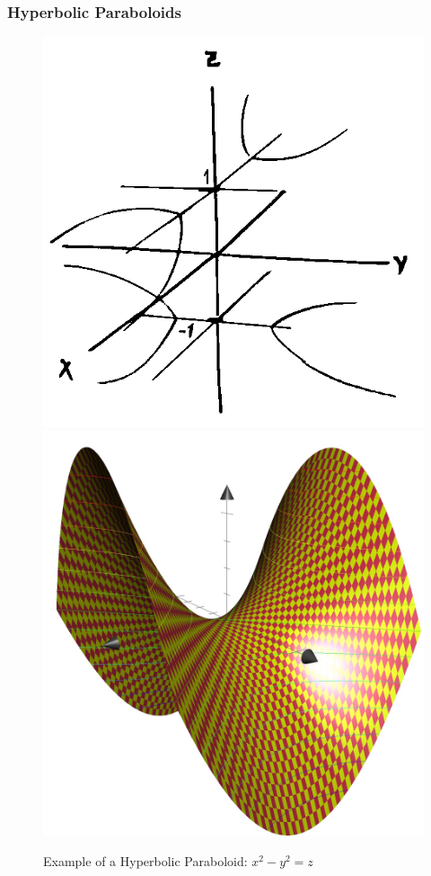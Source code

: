 \documentclass{article}
\begin{document}
\subsubsection{Hyperbolic Paraboloids}
\begin{figure}[h]
  \includegraphics[scale=0.5]{hyperbolic-paraboloid}
  \includegraphics[scale=0.1]{hyperbolic-paraboloid-digital}
  \centering
  \caption{Example of a Hyperbolic Paraboloid: $x^2 - y^2 = z$}
  \label{fig:hyperbolic-paraboloid}
\end{figure}
\end{document}
